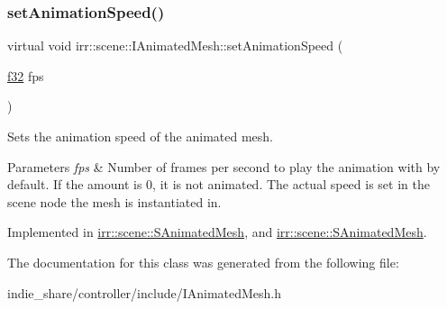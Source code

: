 \subsubsection{\texorpdfstring{set\+Animation\+Speed()}{setAnimationSpeed()}\hspace{0.1cm}{\footnotesize\ttfamily [2/2]}}
{\footnotesize\ttfamily virtual void irr\+::scene\+::\+I\+Animated\+Mesh\+::set\+Animation\+Speed (\begin{DoxyParamCaption}\item[{\hyperlink{namespaceirr_a0277be98d67dc26ff93b1a6a1d086b07}{f32}}]{fps }\end{DoxyParamCaption})\hspace{0.3cm}{\ttfamily [pure virtual]}}



Sets the animation speed of the animated mesh. 


\begin{DoxyParams}{Parameters}
{\em fps} & Number of frames per second to play the animation with by default. If the amount is 0, it is not animated. The actual speed is set in the scene node the mesh is instantiated in. \\
\hline
\end{DoxyParams}


Implemented in \hyperlink{structirr_1_1scene_1_1SAnimatedMesh_ae7a32638fe5c59007d044bbc3c170108}{irr\+::scene\+::\+S\+Animated\+Mesh}, and \hyperlink{structirr_1_1scene_1_1SAnimatedMesh_ae7a32638fe5c59007d044bbc3c170108}{irr\+::scene\+::\+S\+Animated\+Mesh}.



The documentation for this class was generated from the following file\+:\begin{DoxyCompactItemize}
\item 
indie\+\_\+share/controller/include/I\+Animated\+Mesh.\+h\end{DoxyCompactItemize}
